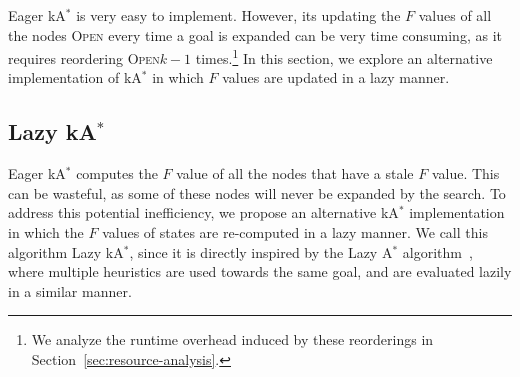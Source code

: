 \documentclass[smallextended]{svjour3}       %
\newcommand{\astar}{A$^*$\xspace}
\newcommand{\kastar}{kA$^*$\xspace}
\newcommand{\open}{\textsc{Open}\xspace}
\begin{document}
Eager \kastar is very easy to implement. However, its updating the $F$ values of all the nodes \open every time a goal is expanded can be very time consuming, as it requires reordering \open $k-1$ times.\footnote{We analyze the runtime overhead induced by these reorderings in Section~\ref{sec:resource-analysis}.} 
In this section, we explore an alternative implementation of \kastar in which $F$ values are updated in a lazy manner. 


\subsection{Lazy \kastar}


Eager \kastar computes the $F$ value of all the nodes that have a stale $F$ value. This can be wasteful, as some of these nodes will never be expanded by the search. 
To address this potential inefficiency, we propose an alternative \kastar implementation in which the $F$ values of states are re-computed in a lazy manner. We call this algorithm Lazy \kastar, since it is directly inspired by the Lazy \astar algorithm~\cite{betzalel2015typeSystem,tolpin2013toward}, where multiple heuristics are used towards the same goal, and are evaluated lazily in a similar manner.
\end{document}
